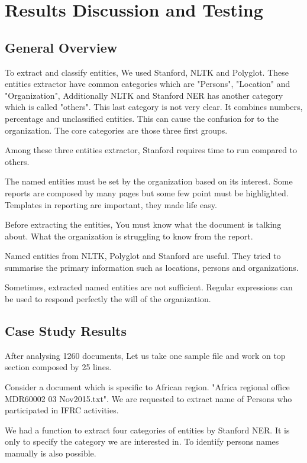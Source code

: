 \chapter{Results Discussion and Testing}
\section{General Overview}
To extract and classify entities, We used Stanford, NLTK and Polyglot. These entities extractor have common categories which are "Persons", "Location" and "Organization", Additionally NLTK and Stanford NER has another category which is called "others". This last category is not very clear. It combines numbers, percentage and unclassified entities. This can cause the confusion for to the organization. The core categories are those three first groups.

Among these three entities extractor, Stanford requires time to run compared to others.

The named entities must be set by the organization based on its interest. Some reports are composed by many pages but some few point must be highlighted. Templates in reporting are important, they made life easy.

Before extracting the entities, You must know what the document is  talking about. What the organization is struggling to know from the report.

Named entities from NLTK, Polyglot and Stanford are useful. They tried to summarise the primary information such as locations, persons and organizations. 

Sometimes, extracted named entities are not sufficient. Regular expressions can be used to respond perfectly the will of the organization.

\section{Case Study Results}
After analysing 1260 documents, Let us take one sample file and work on top section composed by 25 lines.

Consider a document which is specific to African region. "Africa regional office MDR60002 03 Nov2015.txt". We are requested to extract name of Persons who participated in IFRC activities.

We had a function to extract four categories of entities by Stanford NER. It is only to specify the category we are interested in. To identify persons names manually is also possible.

